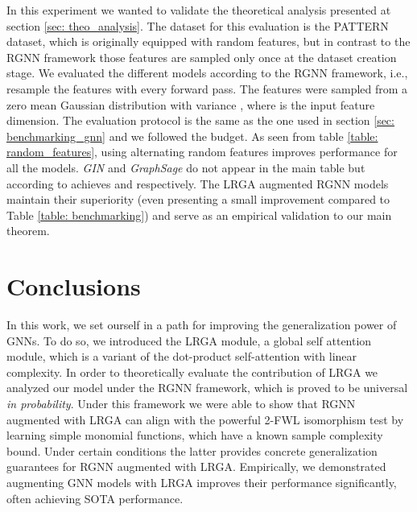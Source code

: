 \documentclass{article} \usepackage{iclr2021_conference,times}
\newcommand{\ie}{{i.e.}}
\begin{document}
In this experiment we wanted to validate the theoretical analysis presented at section \ref{sec: theo_analysis}. The dataset for this evaluation is the PATTERN dataset, which is originally equipped with random features, but in contrast to the RGNN framework those features are sampled only once at the dataset creation stage. We evaluated the different models according to the RGNN framework, \ie, resample the features with every forward pass. The features were sampled from a zero mean Gaussian distribution with variance , where  is the input feature dimension. The evaluation protocol is the same as the one used in section \ref{sec: benchmarking_gnn} and we followed the  budget. As seen from table \ref{table: random_features}, using alternating random features improves performance for all the models. \textit{GIN} and \textit{GraphSage} do not appear in the main table but according to \citep{dwivedi2020benchmarking} achieves  and  respectively. The LRGA augmented RGNN models maintain their superiority (even presenting a small improvement compared to Table \ref{table: benchmarking}) and serve as an empirical validation to our main theorem.



\vspace{-5pt}



\section{Conclusions}
\vspace{-5pt}
In this work, we set ourself in a path for improving the generalization power of GNNs. To do so, we introduced the LRGA module, a global self attention module, which is a variant of the dot-product self-attention with linear complexity. In order to theoretically evaluate the contribution of LRGA we analyzed our model under the RGNN framework, which is proved to be universal \emph{in probability}. Under this framework we were able to show that RGNN augmented with LRGA can align with the powerful 2-FWL isomorphism test by learning simple monomial functions, which have a known sample complexity bound. Under certain conditions the latter provides concrete generalization guarantees for RGNN augmented with LRGA. Empirically, we demonstrated augmenting GNN models with LRGA improves their performance significantly, often achieving SOTA performance.

\newpage
\end{document}
